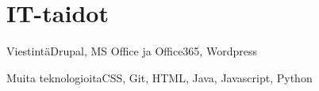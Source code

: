 \documentclass{tccv_fin}
\begin{document}


     



     


     

\section{IT-taidot}

\begin{factlist}
\item{Viestintä}{Drupal, MS Office ja Office365, Wordpress}
\item{Muita teknologioita}{CSS, Git, HTML, Java, Javascript, Python}
\end{factlist}
\end{document}

